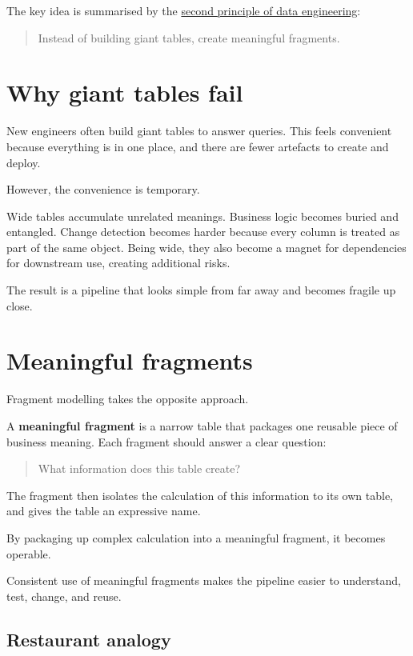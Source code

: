 \documentclass[10pt,openany,10pt]{book}
\begin{document}
The key idea is summarised by the
\hyperref[docs-creating-information-expressiveness-and-fragment-modelling]{second
principle of data engineering}:

\begin{quote}
Instead of building giant tables, create meaningful fragments.
\end{quote}

\section{Why giant tables fail}\label{why-giant-tables-fail}

New engineers often build giant tables to answer queries. This feels
convenient because everything is in one place, and there are fewer
artefacts to create and deploy.

However, the convenience is temporary.

Wide tables accumulate unrelated meanings. Business logic becomes buried
and entangled. Change detection becomes harder because every column is
treated as part of the same object. Being wide, they also become a
magnet for dependencies for downstream use, creating additional risks.

The result is a pipeline that looks simple from far away and becomes
fragile up close.

\section{Meaningful fragments}\label{meaningful-fragments}

Fragment modelling takes the opposite approach.

A \textbf{meaningful fragment} is a narrow table that packages one
reusable piece of business meaning. Each fragment should answer a clear
question:

\begin{quote}
What information does this table create?
\end{quote}

The fragment then isolates the calculation of this information to its
own table, and gives the table an expressive name.

By packaging up complex calculation into a meaningful fragment, it
becomes operable.

Consistent use of meaningful fragments makes the pipeline easier to
understand, test, change, and reuse.

\subsection{Restaurant analogy}\label{restaurant-analogy}
\end{document}
